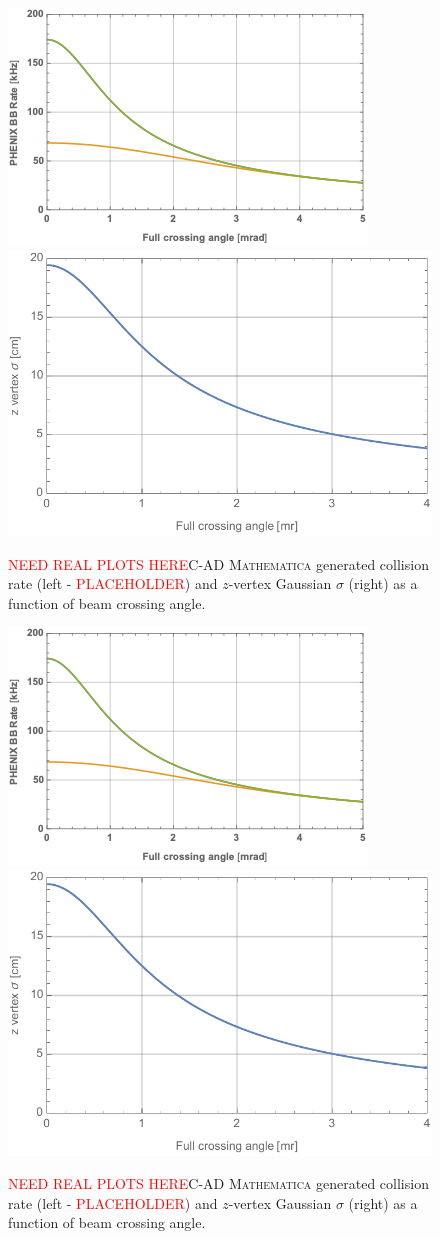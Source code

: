 \begin{figure}
    \centering
        \includegraphics[width=0.47\linewidth]{figs/figure_cad1_prelim.png}  
    \includegraphics[width=0.47\linewidth]{figs/auau2023-202008130.pdf}
    \caption{{\textcolor{red}{NEED REAL PLOTS HERE}}C-AD {\textsc{Mathematica}} generated \pp collision rate (left - {\textcolor{red}{PLACEHOLDER}}) and $z$-vertex Gaussian $\sigma$ (right) as a function of beam crossing angle.}
    \label{fig:mathpp1}
\end{figure}

\begin{figure}
    \centering
        \includegraphics[width=0.47\linewidth]{figs/figure_cad1_prelim.png}  
    \includegraphics[width=0.47\linewidth]{figs/auau2023-202008130.pdf}
    \caption{{\textcolor{red}{NEED REAL PLOTS HERE}}C-AD {\textsc{Mathematica}} generated \pp collision rate (left - {\textcolor{red}{PLACEHOLDER}}) and $z$-vertex Gaussian $\sigma$ (right) as a function of beam crossing angle.}
    \label{fig:mathpau1}
\end{figure}


